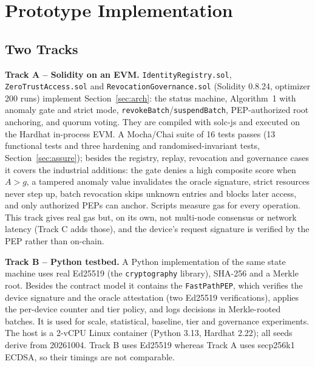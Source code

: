 \section{Prototype Implementation}\label{sec:impl}

\subsection{Two Tracks}\label{sec:env}
\textbf{Track A -- Solidity on an EVM.} \texttt{IdentityRegistry.sol}, \texttt{ZeroTrustAccess.sol} and \texttt{RevocationGovernance.sol} (Solidity 0.8.24, optimizer 200 runs) implement Section~\ref{sec:arch}: the status machine, Algorithm~1 with anomaly gate and strict mode, \texttt{revokeBatch}/\texttt{suspendBatch}, PEP-authorized root anchoring, and quorum voting. They are compiled with solc-js and executed on the Hardhat in-process EVM. A Mocha/Chai suite of 16 tests passes (13 functional tests and three hardening and randomised-invariant tests, Section~\ref{sec:assure}); besides the registry, replay, revocation and governance cases it covers the industrial additions: the gate denies a high composite score when $A>g$, a tampered anomaly value invalidates the oracle signature, strict resources never step up, batch revocation skips unknown entries and blocks later access, and only authorized PEPs can anchor. Scripts measure gas for every operation. This track gives real gas but, on its own, not multi-node consensus or network latency (Track C adds those), and the device's request signature is verified by the PEP rather than on-chain.

\textbf{Track B -- Python testbed.} A Python implementation of the same state machine uses real Ed25519 (the \texttt{cryptography} library), SHA-256 and a Merkle root. Besides the contract model it contains the \texttt{FastPathPEP}, which verifies the device signature and the oracle attestation (two Ed25519 verifications), applies the per-device counter and tier policy, and logs decisions in Merkle-rooted batches. It is used for scale, statistical, baseline, tier and governance experiments. The host is a 2-vCPU Linux container (Python 3.13, Hardhat 2.22); all seeds derive from 20261004. Track B uses Ed25519 whereas Track A uses secp256k1 ECDSA, so their timings are not comparable.

